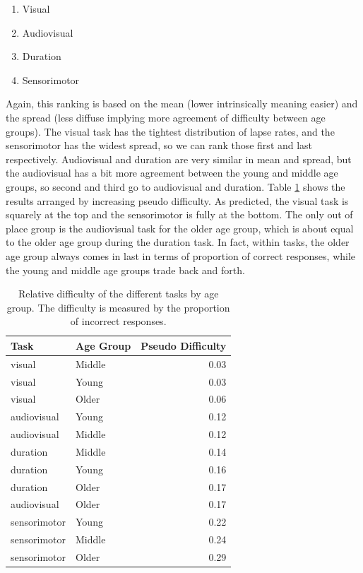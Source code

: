 \documentclass[11pt, oneside, openany]{scrbook}
\providecommand{\tightlist}{%
  \setlength{\itemsep}{0pt}\setlength{\parskip}{0pt}}
\begin{document}
\begin{enumerate}
\def\labelenumi{\arabic{enumi}.}
\tightlist
\item
  Visual
\item
  Audiovisual
\item
  Duration
\item
  Sensorimotor
\end{enumerate}

Again, this ranking is based on the mean (lower intrinsically meaning easier) and the spread (less diffuse implying more agreement of difficulty between age groups). The visual task has the tightest distribution of lapse rates, and the sensorimotor has the widest spread, so we can rank those first and last respectively. Audiovisual and duration are very similar in mean and spread, but the audiovisual has a bit more agreement between the young and middle age groups, so second and third go to audiovisual and duration. Table \ref{tab:ch050-Orange-Tigerfish} shows the results arranged by increasing pseudo difficulty. As predicted, the visual task is squarely at the top and the sensorimotor is fully at the bottom. The only out of place group is the audiovisual task for the older age group, which is about equal to the older age group during the duration task. In fact, within tasks, the older age group always comes in last in terms of proportion of correct responses, while the young and middle age groups trade back and forth.

\begin{table}[!h]
\centering
\caption{\label{tab:ch050-Orange-Tigerfish}Relative difficulty of the different tasks by age group. The difficulty is measured by the proportion of incorrect responses.}
\centering
\begin{tabular}[t]{llr}
\toprule
Task & Age Group & Pseudo Difficulty\\
\midrule
visual & Middle & 0.03\\
visual & Young & 0.03\\
visual & Older & 0.06\\
audiovisual & Young & 0.12\\
audiovisual & Middle & 0.12\\
\addlinespace
duration & Middle & 0.14\\
duration & Young & 0.16\\
duration & Older & 0.17\\
audiovisual & Older & 0.17\\
sensorimotor & Young & 0.22\\
\addlinespace
sensorimotor & Middle & 0.24\\
sensorimotor & Older & 0.29\\
\bottomrule
\end{tabular}
\end{table}
\end{document}
